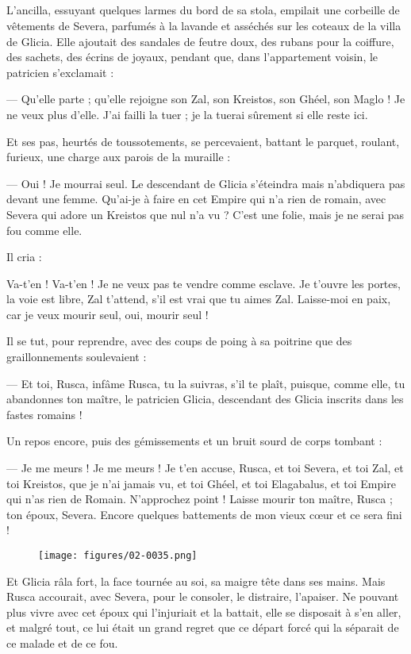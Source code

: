 \documentclass[a4paper, 11pt, oneside, polutonikogreek, french]{article}
\begin{document}
\subsection{}
\paragraph{}
L'ancilla, essuyant quelques larmes du bord de sa stola, empilait une corbeille de vêtements de Severa, parfumés à la lavande et asséchés sur les coteaux de la villa de Glicia. Elle ajoutait des sandales de feutre doux, des rubans pour la coiffure, des sachets, des écrins de joyaux, pendant que, dans l'appartement voisin, le patricien s'exclamait :

--- Qu'elle parte ; qu'elle rejoigne son Zal, son Kreistos, son Ghéel, son Maglo ! Je ne veux plus d'elle. J'ai failli la tuer ; je la tuerai sûrement si elle reste ici.

Et ses pas, heurtés de toussotements, se percevaient, battant le parquet, roulant, furieux, une charge aux parois de la muraille :

--- Oui ! Je mourrai seul. Le descendant de Glicia s'éteindra mais n'abdiquera pas devant une femme. Qu'ai-je à faire en cet Empire qui n'a rien de romain, avec Severa qui adore un Kreistos que nul n'a vu ? C'est une folie, mais je ne serai pas fou comme elle.

Il cria :

Va-t’en ! Va-t’en ! Je ne veux pas te vendre comme esclave. Je t'ouvre les portes, la voie est libre, Zal t'attend, s'il est vrai que tu aimes Zal. Laisse-moi en paix, car je veux mourir seul, oui, mourir seul !

Il se tut, pour reprendre, avec des coups de poing à sa poitrine que des graillonnements soulevaient :

--- Et toi, Rusca, infâme Rusca, tu la suivras, s'il te plaît, puisque, comme elle, tu abandonnes ton maître, le patricien Glicia, descendant des Glicia inscrits dans les fastes romains !

Un repos encore, puis des gémissements et un bruit sourd de corps tombant :

--- Je me meurs ! Je me meurs ! Je t'en accuse, Rusca, et toi Severa, et toi Zal, et toi Kreistos, que je n'ai jamais vu, et toi Ghéel, et toi Elagabalus, et toi Empire qui n'as rien de Romain. N'approchez point ! Laisse mourir ton maître, Rusca ; ton époux, Severa. Encore quelques battements de mon vieux cœur et ce sera fini !
\begin{figure}[H]
\centering
\texttt{[image: figures/02-0035.png]}
\end{figure}
Et Glicia râla fort, la face tournée au soi, sa maigre tête dans ses mains. Mais Rusca accourait, avec Severa, pour le consoler, le distraire, l'apaiser. Ne pouvant plus vivre avec cet époux qui l'injuriait et la battait, elle se disposait à s'en aller, et malgré tout, ce lui était un grand regret que ce départ forcé qui la séparait de ce malade et de ce fou.
\end{document}
